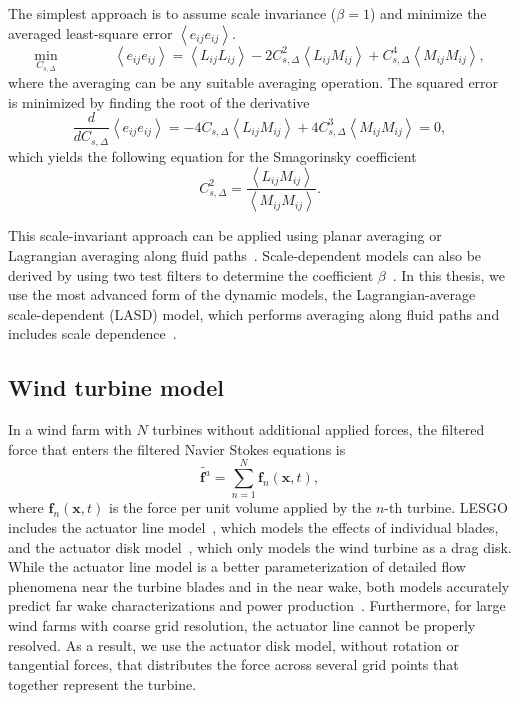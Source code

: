 The simplest approach is to assume scale invariance ($\beta = 1$) and minimize the averaged least-square error $\left \langle e_{ij} e_{ij} \right \rangle$.
\begin{equation}
\underset{C_{s,\Delta}}{\mathrm{min}} \qquad \qquad \left \langle e_{ij} e_{ij} \right \rangle = \left \langle L_{ij} L_{ij} \right \rangle - 2 C_{s,\Delta}^2 \left \langle L_{ij} M_{ij} \right \rangle + C_{s,\Delta}^4\left \langle M_{ij} M_{ij} \right \rangle,
\end{equation} 
where the averaging can be any suitable averaging operation. The squared error is minimized by finding the root of the derivative
\begin{equation}
\frac{d}{d C_{s,\Delta}} \left \langle e_{ij} e_{ij} \right \rangle = -4 C_{s,\Delta} \left \langle L_{ij} M_{ij} \right \rangle + 4C_{s,\Delta}^3\left \langle M_{ij} M_{ij} \right \rangle = 0,
\end{equation}
which yields the following equation for the Smagorinsky coefficient
\begin{equation}
 C_{s,\Delta}^2 = \frac{\left \langle L_{ij} M_{ij} \right \rangle}{\left \langle M_{ij} M_{ij} \right \rangle}.
\end{equation}

This scale-invariant approach can be applied using planar averaging or Lagrangian averaging along fluid paths~\cite{Bou-Zeid2005a}. Scale-dependent models can also be derived by using two test filters to determine the coefficient $\beta$~\cite{Porte-Agel2000a}. In this thesis, we use the most advanced form of the dynamic models, the Lagrangian-average scale-dependent (LASD) model, which performs averaging along fluid paths and includes scale dependence~\cite{Bou-Zeid2005a}.

\subsection{Wind turbine model}
\label{subsec:methods-les-turbine}
In a wind farm with $N$ turbines without additional applied forces, the filtered force that enters the filtered Navier Stokes equations is
\begin{equation}
\tilde{\boldsymbol{f}^a} = \sum_{n=1}^N \mathbf{f}_n(\mathbf{x},t),
\end{equation}
where $ \mathbf{f}_n(\mathbf{x},t)$ is the force per unit volume applied by the $n$-th turbine. LESGO includes the actuator line model~\cite{Martinez2018a}, which models the effects of individual blades, and the actuator disk model~\cite{Calaf2010a}, which only models the wind turbine as a drag disk. While the actuator line model is a better parameterization of detailed flow phenomena near the turbine blades and in the near wake, both models accurately predict far wake characterizations and power production~\cite{Stevens2018a}. Furthermore, for large wind farms with coarse grid resolution, the actuator line cannot be properly resolved. As a result, we use the actuator disk model, without rotation or tangential forces, that distributes the force across several grid points that together represent the turbine. 


